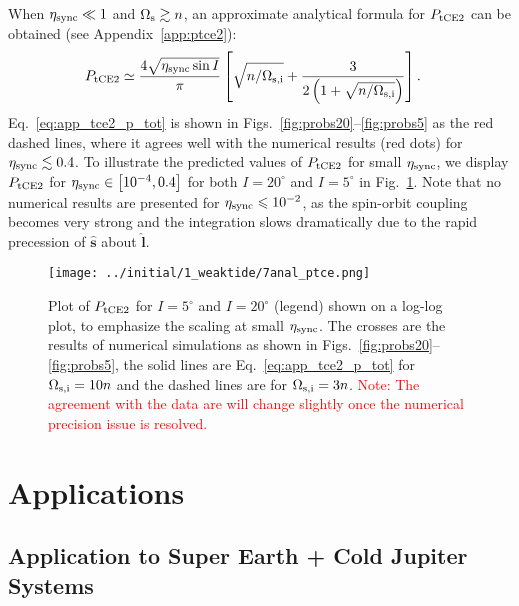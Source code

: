 \documentclass[
        fleqn,
        usenatbib,
        referee,
    ]{mnras}
\newcommand*{\p}[1]{\left(#1\right)}
\newcommand*{\s}[1]{\left[#1\right]}
\newcommand*{\uv}[1]{\hat{\boldsymbol{\mathbf{#1}}}}
\newlength{\colummwidth}
\begin{document}
When $\eta_{\rm sync} \ll 1$ and $\Omega_{\rm s} \gtrsim n$, an approximate
analytical formula for $P_{\rm tCE2}$ can be obtained (see
Appendix~\ref{app:ptce2}):
\begin{align}
    P_{\rm tCE2} &\simeq
            \frac{4\sqrt{\eta _{\rm sync} \sin I}}{\pi}\s{
                \sqrt{n / \Omega_{\rm s, i}}
                + \frac{3}{2\p{1
                + \sqrt{n / \Omega_{\rm s, i}}}}}.\label{eq:app_tce2_p_tot}
\end{align}
Eq.~\eqref{eq:app_tce2_p_tot} is shown in
Figs.~\ref{fig:probs20}--\ref{fig:probs5} as the red dashed lines, where it
agrees well with the numerical results (red dots) for $\eta_{\rm sync} \lesssim
0.4$. To illustrate the predicted values of $P_{\rm tCE2}$ for small $\eta_{\rm
sync}$, we display $P_{\rm tCE2}$ for $\eta_{\rm sync} \in \s{10^{-4}, 0.4}$ for
both $I = 20^\circ$ and $I = 5^\circ$ in Fig.~\ref{fig:anal_ptce}. Note that no
numerical results are presented for $\eta_{\rm sync} \leq 10^{-2}$, as the
spin-orbit coupling becomes very strong and the integration slows dramatically
due to the rapid precession of $\uv{s}$ about $\uv{l}$.
\begin{figure}
    \centering
    \texttt{[image: ../initial/1\_weaktide/7anal\_ptce.png]}
    \caption{Plot of $P_{\rm tCE2}$ for $I = 5^\circ$ and $I = 20^\circ$
    (legend) shown on a log-log plot, to emphasize the scaling at small
    $\eta_{\rm sync}$. The crosses are the results of numerical simulations as
    shown in Figs.~\ref{fig:probs20}--\ref{fig:probs5}, the solid lines are
    Eq.~\eqref{eq:app_tce2_p_tot} for $\Omega_{\rm s, i} = 10n$ and the dashed
    lines are for $\Omega_{\rm s, i} = 3n$. \textcolor{red}{Note: The agreement
    with the data are will change slightly once the numerical
    precision issue is resolved.}}\label{fig:anal_ptce}
\end{figure}

\section{Applications}\label{s:applications}

\subsection{Application to Super Earth + Cold Jupiter Systems
}\label{ss:disc_sehj}
\end{document}
